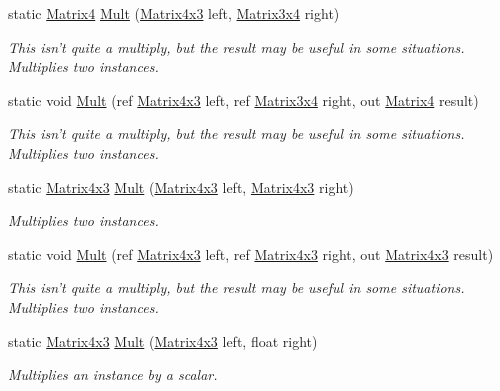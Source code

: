 \begin{DoxyCompactItemize}
static \hyperlink{struct_open_t_k_1_1_matrix4}{Matrix4} \hyperlink{struct_open_t_k_1_1_matrix4x3_a84a44c07c1bbea0cacc4cc8bf1a91ebc}{Mult} (\hyperlink{struct_open_t_k_1_1_matrix4x3}{Matrix4x3} left, \hyperlink{struct_open_t_k_1_1_matrix3x4}{Matrix3x4} right)
\begin{DoxyCompactList}\small\item\em This isn't quite a multiply, but the result may be useful in some situations. Multiplies two instances. \end{DoxyCompactList}\item 
static void \hyperlink{struct_open_t_k_1_1_matrix4x3_abdce517730afb3155fbca85c47fa9619}{Mult} (ref \hyperlink{struct_open_t_k_1_1_matrix4x3}{Matrix4x3} left, ref \hyperlink{struct_open_t_k_1_1_matrix3x4}{Matrix3x4} right, out \hyperlink{struct_open_t_k_1_1_matrix4}{Matrix4} result)
\begin{DoxyCompactList}\small\item\em This isn't quite a multiply, but the result may be useful in some situations. Multiplies two instances. \end{DoxyCompactList}\item 
static \hyperlink{struct_open_t_k_1_1_matrix4x3}{Matrix4x3} \hyperlink{struct_open_t_k_1_1_matrix4x3_a04d4502f192bdceea2c52d5bbba38496}{Mult} (\hyperlink{struct_open_t_k_1_1_matrix4x3}{Matrix4x3} left, \hyperlink{struct_open_t_k_1_1_matrix4x3}{Matrix4x3} right)
\begin{DoxyCompactList}\small\item\em Multiplies two instances. \end{DoxyCompactList}\item 
static void \hyperlink{struct_open_t_k_1_1_matrix4x3_a8ecf97bf8dae3eb9de7af456bc67bc0a}{Mult} (ref \hyperlink{struct_open_t_k_1_1_matrix4x3}{Matrix4x3} left, ref \hyperlink{struct_open_t_k_1_1_matrix4x3}{Matrix4x3} right, out \hyperlink{struct_open_t_k_1_1_matrix4x3}{Matrix4x3} result)
\begin{DoxyCompactList}\small\item\em This isn't quite a multiply, but the result may be useful in some situations. Multiplies two instances. \end{DoxyCompactList}\item 
static \hyperlink{struct_open_t_k_1_1_matrix4x3}{Matrix4x3} \hyperlink{struct_open_t_k_1_1_matrix4x3_a23987d94f9339906a2cee70110c46d19}{Mult} (\hyperlink{struct_open_t_k_1_1_matrix4x3}{Matrix4x3} left, float right)
\begin{DoxyCompactList}\small\item\em Multiplies an instance by a scalar. \end{DoxyCompactList}\item 

\end{DoxyCompactItemize}
